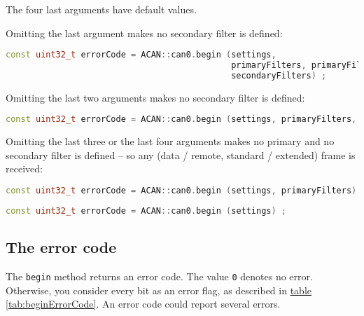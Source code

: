 \documentclass[9pt, a4paper, obeyspaces, openany]{extarticle}
\newcommand \subsectionLabel[2]{\subsection{#1}\label{subsec:#2}}
\newcommand\refTableau[1]{\hyperref[tab:#1]{table \ref*{tab:#1}}}
\begin{document}
The four last arguments have default values.

Omitting the last argument makes no secondary filter is defined:
{ \small\begin{lstlisting}[language=c++]
const uint32_t errorCode = ACAN::can0.begin (settings,
                                             primaryFilters, primaryFilterCount,
                                             secondaryFilters) ;
\end{lstlisting}}



Omitting the last two arguments makes no secondary filter is defined:
{ \small\begin{lstlisting}[language=c++]
const uint32_t errorCode = ACAN::can0.begin (settings, primaryFilters, primaryFilterCount) ;
\end{lstlisting}}

Omitting the last three or the last four arguments makes no primary and no secondary filter is defined -- so any (data / remote, standard / extended) frame is received:
{ \small\begin{lstlisting}[language=c++]
const uint32_t errorCode = ACAN::can0.begin (settings, primaryFilters) ;
\end{lstlisting}}

{ \small\begin{lstlisting}[language=c++]
const uint32_t errorCode = ACAN::can0.begin (settings) ;
\end{lstlisting}}





\subsectionLabel{The error code}{errorCodeMethodBegin}

The \texttt{begin} method returns an error code. The value \texttt{0} denotes no error. Otherwise, you consider every bit as an error flag, as described in \refTableau{beginErrorCode}. An error code could report several errors.
\end{document}
